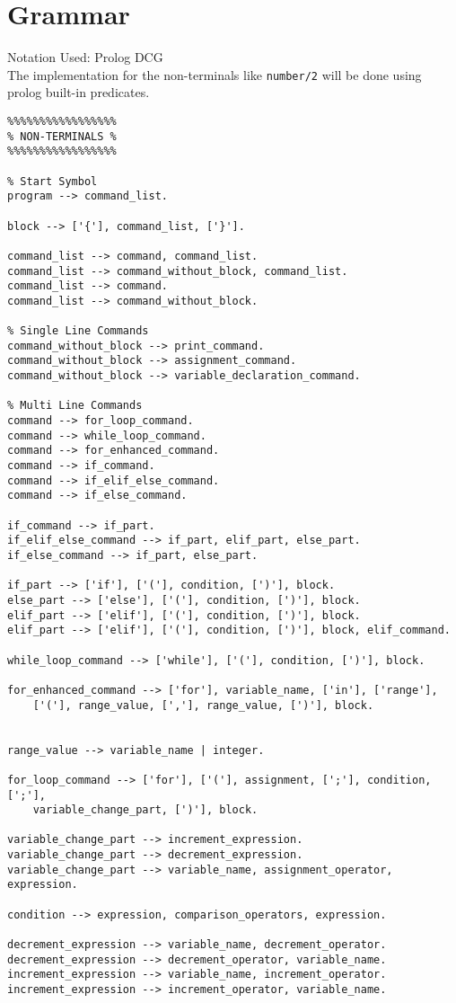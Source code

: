 \documentclass[12pt,letterpaper]{article}
\begin{document}
\section{Grammar}
Notation Used: Prolog DCG \\
The implementation for the non-terminals like \texttt{number/2} will be done using prolog built-in predicates.
\begin{verbatim}
%%%%%%%%%%%%%%%%%
% NON-TERMINALS %
%%%%%%%%%%%%%%%%%

% Start Symbol
program --> command_list.

block --> ['{'], command_list, ['}'].

command_list --> command, command_list.
command_list --> command_without_block, command_list.
command_list --> command.
command_list --> command_without_block.

% Single Line Commands
command_without_block --> print_command.
command_without_block --> assignment_command.
command_without_block --> variable_declaration_command.

% Multi Line Commands
command --> for_loop_command.
command --> while_loop_command.
command --> for_enhanced_command.
command --> if_command.
command --> if_elif_else_command.
command --> if_else_command.

if_command --> if_part.
if_elif_else_command --> if_part, elif_part, else_part.
if_else_command --> if_part, else_part.

if_part --> ['if'], ['('], condition, [')'], block.
else_part --> ['else'], ['('], condition, [')'], block.
elif_part --> ['elif'], ['('], condition, [')'], block.
elif_part --> ['elif'], ['('], condition, [')'], block, elif_command.

while_loop_command --> ['while'], ['('], condition, [')'], block.

for_enhanced_command --> ['for'], variable_name, ['in'], ['range'],
    ['('], range_value, [','], range_value, [')'], block.


range_value --> variable_name | integer.

for_loop_command --> ['for'], ['('], assignment, [';'], condition, [';'],
    variable_change_part, [')'], block.

variable_change_part --> increment_expression.
variable_change_part --> decrement_expression.
variable_change_part --> variable_name, assignment_operator, expression.

condition --> expression, comparison_operators, expression.

decrement_expression --> variable_name, decrement_operator.
decrement_expression --> decrement_operator, variable_name.
increment_expression --> variable_name, increment_operator.
increment_expression --> increment_operator, variable_name.


\end{verbatim}
\end{document}
